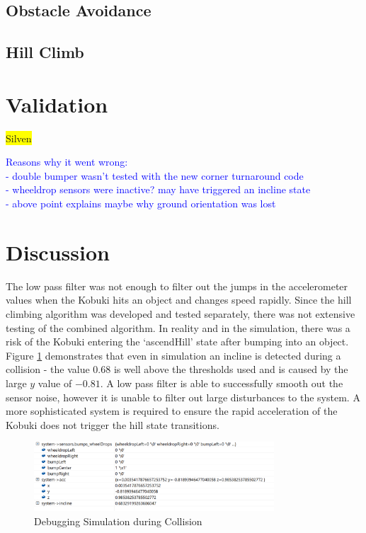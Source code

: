 \documentclass[11pt]{article}
\begin{document}
\subsection{Obstacle Avoidance}

\subsection{Hill Climb}

\section{Validation}
\colorbox{yellow}{Silven}

\textcolor{blue}{Reasons why it went wrong:\\
- double bumper wasn't tested with the new corner turnaround code\\
- wheeldrop sensors were inactive? may have triggered an incline state\\
- above point explains maybe why ground orientation was lost}

\section{Discussion}

The low pass filter was not enough to filter out the jumps in the accelerometer values when the Kobuki hits an object and changes speed rapidly. Since the hill climbing algorithm was developed and tested separately, there was not extensive testing of the combined algorithm. In reality and in the simulation, there was a risk of the Kobuki entering the `ascendHill' state after bumping into an object. Figure \ref{fig:debug_incline} demonstrates that even in simulation an incline is detected during a collision - the value $0.68$ is well above the thresholds used and is caused by the large $y$ value of $-0.81$. A low pass filter is able to successfully smooth out the sensor noise, however it is unable to filter out large disturbances to the system. A more sophisticated system is required to ensure the rapid acceleration of the Kobuki does not trigger the hill state transitions.

\begin{figure}[h]
    \centering
    \includegraphics[width=0.8\textwidth]{debug_incline}
    \caption{Debugging Simulation during Collision}
    \label{fig:debug_incline}
\end{figure}
\end{document}
